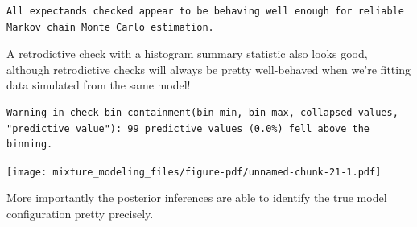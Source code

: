 \documentclass[
  letterpaper,
  DIV=11,
  numbers=noendperiod]{scrartcl}
\newenvironment{Shaded}{\begin{snugshade}}{\end{snugshade}}
\newcommand{\AttributeTok}[1]{\textcolor[rgb]{0.40,0.45,0.13}{#1}}
\newcommand{\DecValTok}[1]{\textcolor[rgb]{0.68,0.00,0.00}{#1}}
\newcommand{\FloatTok}[1]{\textcolor[rgb]{0.68,0.00,0.00}{#1}}
\newcommand{\FunctionTok}[1]{\textcolor[rgb]{0.28,0.35,0.67}{#1}}
\newcommand{\NormalTok}[1]{\textcolor[rgb]{0.00,0.23,0.31}{#1}}
\newcommand{\SpecialCharTok}[1]{\textcolor[rgb]{0.37,0.37,0.37}{#1}}
\newcommand{\StringTok}[1]{\textcolor[rgb]{0.13,0.47,0.30}{#1}}
\begin{document}
\begin{verbatim}
All expectands checked appear to be behaving well enough for reliable
Markov chain Monte Carlo estimation.
\end{verbatim}

A retrodictive check with a histogram summary statistic also looks good,
although retrodictive checks will always be pretty well-behaved when
we're fitting data simulated from the same model!

\begin{Shaded}
\end{Shaded}

\begin{verbatim}
Warning in check_bin_containment(bin_min, bin_max, collapsed_values,
"predictive value"): 99 predictive values (0.0%) fell above the binning.
\end{verbatim}

\texttt{[image: mixture\_modeling\_files/figure-pdf/unnamed-chunk-21-1.pdf]}

More importantly the posterior inferences are able to identify the true
model configuration pretty precisely.
\end{document}
